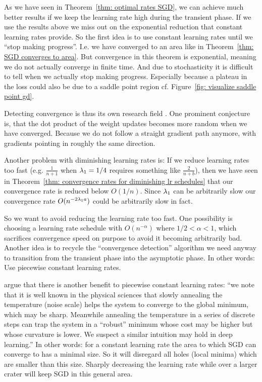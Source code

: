 As we have seen in Theorem~\ref{thm: optimal rates SGD}, we can achieve
much better results if we keep the learning rate high during the transient
phase. If we use the results above we miss out on the exponential reduction that
constant learning rates provide. So the first idea is to use constant learning
rates until we ``stop making progress''. I.e. we have converged to an area like
in Theorem~\ref{thm: SGD converges to area}. But convergence in this theorem is
exponential, meaning we do not actually converge in finite time. And due to
stochasticity it is difficult to tell when we actually stop making progress.
Especially because a plateau in the loss could also be due to a saddle point
region cf. Figure~\ref{fig: visualize saddle point gd}.

Detecting convergence is thus its own research field \parencite[for a recent
approach including an overview of previous work see
e.g.][]{pesmeConvergenceDiagnosticBasedStep2020}. One prominent conjecture is,
that the dot product of the weight updates becomes more random when we have
converged. Because we do not follow a straight gradient path anymore, with
gradients pointing in roughly the same direction.

Another problem with diminishing learning rates is: If we reduce learning rates
too fast (e.g. \(\tfrac{1}{n+1}\) when \(\lambda_1=1/4\) requires something
like \(\tfrac{2}{n+b}\)), then we have seen in Theorem~\ref{thm: convergence
rates for diminishing lr schedules} that our convergence rate is reduced below
\(O(1/n)\). Since \(\lambda_1\) can be arbitrarily slow our convergence rate
\(O(n^{-2\lambda_1 a})\) could be arbitrarily slow in fact.

So we want to avoid reducing the learning rate too fast. One possibility is
choosing a learning rate schedule with \(O(n^{-\alpha})\) where \(1/2<\alpha<1\),
which sacrifices convergence speed on purpose to avoid it becoming arbitrarily
bad. Another idea is to recycle the ``convergence detection'' algorithm we
need anyway to transition from the transient phase into the asymptotic phase.
In other words: Use piecewise constant learning rates.

\textcite{smithDonDecayLearning2018} argue that there is another benefit to
piecewise constant learning rates: ``we note that it is well known in the
physical sciences that slowly annealing the temperature (noise scale) helps the
system to converge to the global minimum, which may be sharp. Meanwhile
annealing the temperature in a series of discrete steps can trap the system in a
“robust” minimum whose cost may be higher but whose curvature is lower. We
suspect a similar intuition may hold in deep learning.''
In other words: for a constant learning rate the area to which SGD can converge
to has a minimal size. So it will disregard all holes (local minima) which are
smaller than this size. Sharply decreasing the learning rate while over a larger
crater will keep SGD in this general area.


